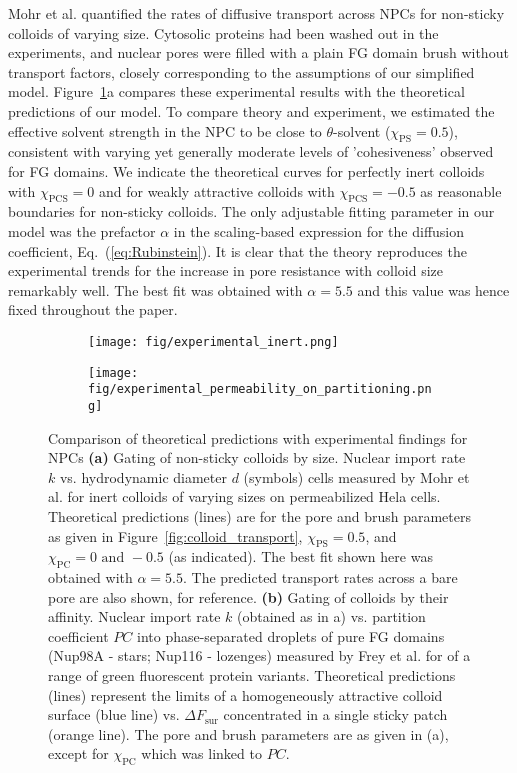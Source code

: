 \documentclass[12pt, a4paper]{article}
\begin{document}
Mohr et al. quantified the rates of diffusive transport across NPCs for non-sticky colloids of varying size.
Cytosolic proteins had been washed out in the experiments, and nuclear pores were filled with a plain FG domain brush without transport factors, closely corresponding to the assumptions of our simplified model.
Figure~\ref{fig:NPC_comparison}a compares these experimental results with the theoretical predictions of our model.
To compare theory and experiment, we estimated the effective solvent strength in the NPC to be close to $\theta$-solvent ($\chi_{\text{PS}} = 0.5$), consistent with varying yet generally moderate levels of 'cohesiveness' observed for FG domains.
We indicate the theoretical curves for perfectly inert colloids with $\chi_{\text{PCS}} = 0$ and for weakly attractive colloids with $\chi_{\text{PCS}} = -0.5$ as reasonable boundaries for non-sticky colloids. 
The only adjustable fitting parameter in our model was the prefactor $\alpha$ in the scaling-based expression for the diffusion coefficient, Eq.~(\ref{eq:Rubinstein}).
It is clear that the theory reproduces the experimental trends for the increase in pore resistance with colloid size remarkably well.
The best fit was obtained with $\alpha = 5.5$ and this value was hence fixed  throughout the paper.

\begin{figure}
    \centering
    \begin{subfigure}[b]{0.45\textwidth}
        \texttt{[image: fig/experimental\_inert.png]}
    \end{subfigure}
    \begin{subfigure}[b]{0.45\textwidth}
        \texttt{[image: fig/experimental\_permeability\_on\_partitioning.png]}
    \end{subfigure}
    \caption{
    Comparison of theoretical predictions with experimental findings for NPCs
    \textbf{(a)} 
    Gating of non-sticky colloids by size.
    Nuclear import rate $k$ vs. hydrodynamic diameter $d$ (symbols) cells measured by Mohr et al. for inert colloids of varying sizes on permeabilized Hela cells.
    Theoretical predictions (lines) are for the pore and brush parameters as given in Figure~\ref{fig:colloid_transport}, $\chi_{\text{PS}} = 0.5$, and $\chi_{\text{PC}} = 0 \text{ and } -0.5$ (as indicated).
    The best fit shown here was obtained with $\alpha = 5.5$.
    The predicted transport rates across a bare pore are also shown, for reference.
    \textbf{(b)} 
    Gating of colloids by their affinity.
    Nuclear import rate $k$ (obtained as in a) vs. partition coefficient $PC$ into phase-separated droplets of pure FG domains (Nup98A - stars; Nup116 - lozenges) measured by Frey et al. for of a range of green fluorescent protein variants.
    Theoretical predictions (lines) represent the limits of a homogeneously attractive colloid surface (blue line) vs. $\Delta F_\text{sur}$ concentrated in a single sticky patch (orange line).
    The pore and brush parameters are as given in (a), except for $\chi_\text{PC}$ which was linked to $PC$.
    }
    \label{fig:NPC_comparison}
\end{figure}
\end{document}
